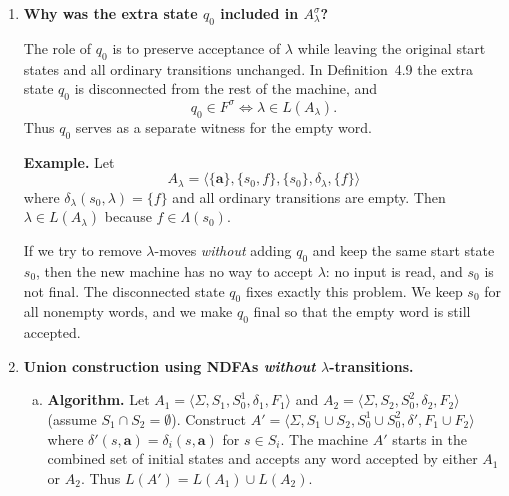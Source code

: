 \begin{enumerate}[{4.}1.]
\textbf{(c) $A^d$ is minimal.}  Here we use a different example.  Let
$A=\langle\{\pmb{a},\pmb{b}\},\{s\},\{s\},\delta,\{s\}\rangle$ where
\[
\delta(s,\pmb{a})=\{s\},\qquad \delta(s,\pmb{b})=\emptyset.
\]
Then $L(A)=\pmb{a}^*$.  The deterministic machine $A^d$ has exactly two states,
$\{s\}$ and $\emptyset$, with
\[
\delta^d(\{s\},\pmb{a})=\{s\},\quad \delta^d(\{s\},\pmb{b})=\emptyset,\quad
\delta^d(\emptyset,\pmb{a})=\delta^d(\emptyset,\pmb{b})=\emptyset.
\]
This is the standard 2-state DFA for $\pmb{a}^*$ over the alphabet
$\{\pmb{a},\pmb{b}\}$, so $A^d$ is minimal.

\item \textbf{Why was the extra state $q_0$ included in $A^{\sigma}_\lambda$?}

The role of $q_0$ is to preserve acceptance of $\lambda$ while leaving the
original start states and all ordinary transitions unchanged.  In
Definition~4.9 the extra state $q_0$ is disconnected from the rest of the
machine, and
\[
q_0\in F^{\sigma}\iff \lambda\in L(A_{\lambda}).
\]
Thus $q_0$ serves as a separate witness for the empty word.

\textbf{Example.}  Let
\[
A_{\lambda}=\langle\{\pmb{a}\},\{s_0,f\},\{s_0\},\delta_{\lambda},\{f\}\rangle
\]
where $\delta_{\lambda}(s_0,\lambda)=\{f\}$ and all ordinary transitions are
empty.  Then $\lambda\in L(A_{\lambda})$ because $f\in\Lambda(s_0)$.

If we try to remove $\lambda$-moves \emph{without} adding $q_0$ and keep the
same start state $s_0$, then the new machine has no way to accept $\lambda$:
no input is read, and $s_0$ is not final.  The disconnected state $q_0$ fixes
exactly this problem.  We keep $s_0$ for all nonempty words, and we make $q_0$
final so that the empty word is still accepted.

\item \textbf{Union construction using NDFAs \emph{without} $\lambda$-transitions.}

\begin{enumerate}[(a)]
  \item \textbf{Algorithm.}  Let $A_1=\langle\Sigma,S_1,S^1_0,\delta_1,F_1\rangle$
  and $A_2=\langle\Sigma,S_2,S^2_0,\delta_2,F_2\rangle$ (assume $S_1\cap S_2=\emptyset$).
  Construct $A'=\langle\Sigma,S_1\cup S_2,S^1_0\cup S^2_0,\delta',F_1\cup F_2\rangle$
  where $\delta'(s,\pmb{a})=\delta_i(s,\pmb{a})$ for $s\in S_i$.
  The machine $A'$ starts in the combined set of initial states and accepts
  any word accepted by either $A_1$ or $A_2$.  Thus $L(A')=L(A_1)\cup L(A_2)$.


\end{enumerate}
\end{enumerate}
